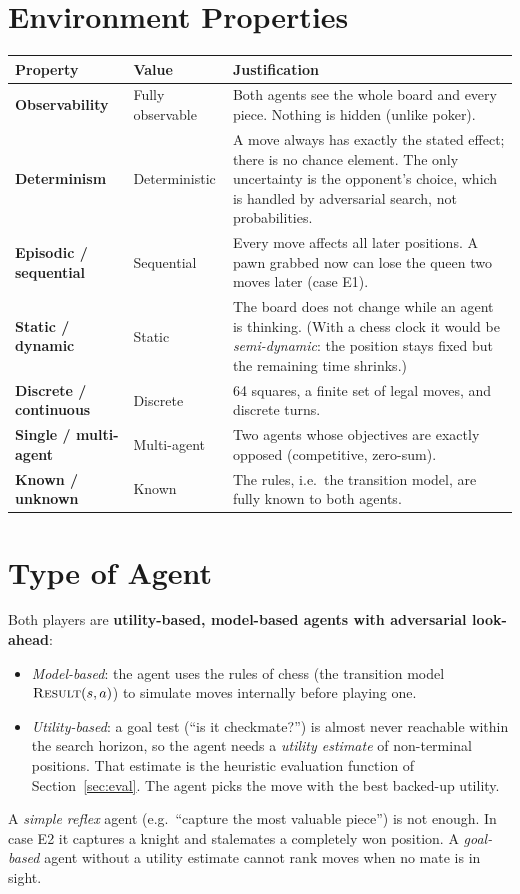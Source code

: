 \documentclass[11pt,a4paper]{article}
\begin{document}
\section{Environment Properties}
\begin{center}
\begin{tabular}{>{\bfseries}p{2.9cm}p{2.7cm}p{9.5cm}}
\toprule
Property & Value & Justification \\
\midrule
Observability & Fully observable & Both agents see the whole board and every piece. Nothing is hidden (unlike poker). \\
Determinism & Deterministic & A move always has exactly the stated effect; there is no chance element.
The only uncertainty is the opponent's choice, which is handled by adversarial search, not probabilities. \\
Episodic / sequential & Sequential & Every move affects all later positions. A pawn grabbed now can lose the queen
two moves later (case E1). \\
Static / dynamic & Static & The board does not change while an agent is thinking. (With a chess clock it would be
\emph{semi-dynamic}: the position stays fixed but the remaining time shrinks.) \\
Discrete / continuous & Discrete & 64 squares, a finite set of legal moves, and discrete turns. \\
Single / multi-agent & Multi-agent & Two agents whose objectives are exactly opposed (competitive, zero-sum). \\
Known / unknown & Known & The rules, i.e.\ the transition model, are fully known to both agents. \\
\bottomrule
\end{tabular}
\end{center}

\section{Type of Agent}
Both players are \textbf{utility-based, model-based agents with adversarial look-ahead}:
\begin{itemize}
\item \emph{Model-based}: the agent uses the rules of chess (the transition model $\textsc{Result}(s,a)$) to
simulate moves internally before playing one.
\item \emph{Utility-based}: a goal test (``is it checkmate?'') is almost never reachable within the search horizon, so
the agent needs a \emph{utility estimate} of non-terminal positions. That estimate is the heuristic evaluation
function of Section~\ref{sec:eval}. The agent picks the move with the best backed-up utility.
\end{itemize}
A \emph{simple reflex} agent (e.g.\ ``capture the most valuable piece'') is not enough. In case E2 it
captures a knight and stalemates a completely won position. A \emph{goal-based} agent without a utility
estimate cannot rank moves when no mate is in sight.
\end{document}
